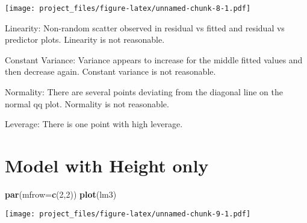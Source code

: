 \documentclass[]{article}
\newenvironment{Shaded}{\begin{snugshade}}{\end{snugshade}}
\newcommand{\KeywordTok}[1]{\textcolor[rgb]{0.13,0.29,0.53}{\textbf{#1}}}
\newcommand{\DataTypeTok}[1]{\textcolor[rgb]{0.13,0.29,0.53}{#1}}
\newcommand{\DecValTok}[1]{\textcolor[rgb]{0.00,0.00,0.81}{#1}}
\newcommand{\StringTok}[1]{\textcolor[rgb]{0.31,0.60,0.02}{#1}}
\newcommand{\OperatorTok}[1]{\textcolor[rgb]{0.81,0.36,0.00}{\textbf{#1}}}
\newcommand{\NormalTok}[1]{#1}
\begin{document}
\texttt{[image: project\_files/figure-latex/unnamed-chunk-8-1.pdf]}

Linearity: Non-random scatter observed in residual vs fitted and
residual vs predictor plots. Linearity is not reasonable.

Constant Variance: Variance appears to increase for the middle fitted
values and then decrease again. Constant variance is not reasonable.

Normality: There are several points deviating from the diagonal line on
the normal qq plot. Normality is not reasonable.

Leverage: There is one point with high leverage.

\section{Model with Height only}\label{model-with-height-only}

\begin{Shaded}
\begin{Highlighting}[]
\KeywordTok{par}\NormalTok{(}\DataTypeTok{mfrow=}\KeywordTok{c}\NormalTok{(}\DecValTok{2}\NormalTok{,}\DecValTok{2}\NormalTok{))}
\KeywordTok{plot}\NormalTok{(lm3)}
\end{Highlighting}
\end{Shaded}

\texttt{[image: project\_files/figure-latex/unnamed-chunk-9-1.pdf]}

\begin{Shaded}
\end{Shaded}
\end{document}
